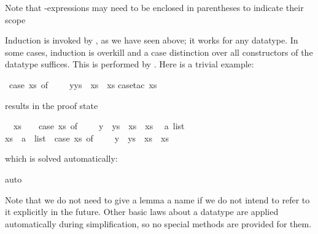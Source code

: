 \begin{isabellebody}
\begin{isamarkuptext}
Note that -expressions may need to be enclosed in parentheses to
indicate their scope%
\end{isamarkuptext}%
\isamarkuptrue%
%
\isamarkuptrue%
%
\begin{isamarkuptext}%
\label{sec:struct-ind-case}
%
Induction is invoked by , as we have seen above; 
it works for any datatype.  In some cases, induction is overkill and a case
distinction over all constructors of the datatype suffices.  This is performed
by .  Here is a trivial example:%
\end{isamarkuptext}%
\isamarkuptrue%
\isamarkupfalse%
\ {\isachardoublequoteopen}{\isacharparenleft}case\ xs\ of\ {\isacharbrackleft}{\isacharbrackright}\ {\isasymRightarrow}\ {\isacharbrackleft}{\isacharbrackright}\ {\isacharbar}\ y{\isacharhash}ys\ {\isasymRightarrow}\ xs{\isacharparenright}\ {\isacharequal}\ xs{\isachardoublequoteclose}\isanewline
%
\isadelimproof
%
\endisadelimproof
%
\isatagproof
{}\isamarkupfalse%
{\isacharparenleft}case{\isacharunderscore}tac\ xs{\isacharparenright}%
\begin{isamarkuptxt}%
\noindent
results in the proof state
\begin{isabelle}%
\ {}{\isachardot}\ xs\ {\isacharequal}\ {\isacharbrackleft}{\isacharbrackright}\ {\isasymLongrightarrow}\ {\isacharparenleft}case\ xs\ of\ {\isacharbrackleft}{\isacharbrackright}\ {\isasymRightarrow}\ {\isacharbrackleft}{\isacharbrackright}\ {\isacharbar}\ y\ {\isacharhash}\ ys\ {\isasymRightarrow}\ xs{\isacharparenright}\ {\isacharequal}\ xs\isanewline
\ {}{\isachardot}\ {\isasymAnd}a\ list{\isachardot}\isanewline
{}xs\ {\isacharequal}\ a\ {\isacharhash}\ list\ {\isasymLongrightarrow}\ {\isacharparenleft}case\ xs\ of\ {\isacharbrackleft}{\isacharbrackright}\ {\isasymRightarrow}\ {\isacharbrackleft}{\isacharbrackright}\ {\isacharbar}\ y\ {\isacharhash}\ ys\ {\isasymRightarrow}\ xs{\isacharparenright}\ {\isacharequal}\ xs%
\end{isabelle}
which is solved automatically:%
\end{isamarkuptxt}%
\isamarkuptrue%
\isamarkupfalse%
{\isacharparenleft}auto{\isacharparenright}\isamarkupfalse%
%
\endisatagproof
{\isafoldproof}%
%
\isadelimproof
%
\endisadelimproof
%
\begin{isamarkuptext}%
Note that we do not need to give a lemma a name if we do not intend to refer
to it explicitly in the future.
Other basic laws about a datatype are applied automatically during
simplification, so no special methods are provided for them.


\end{isamarkuptext}
\end{isabellebody}
